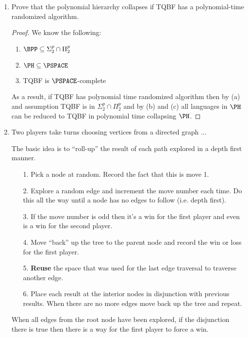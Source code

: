 \documentclass[usletter]{article}
\begin{document}
\begin{enumerate}
  \item Prove that the polynomial hierarchy collapses if TQBF has a polynomial-time randomized algorithm.

    \begin{proof}
      We know the following:

      \begin{enumerate}
        \item $\BPP \subseteq \Sigma_{2}^{p} \cap \Pi_{2}^{p}$
        \item $\PH \subseteq \PSPACE$
        \item TQBF is $\PSPACE$-complete
      \end{enumerate}

      As a result, if TQBF has polynomial time randomized algorithm then by (a) and assumption TQBF is in $\Sigma_{2}^{p} \cap \Pi_{2}^{p}$ and by (b) and (c) all languages in $\PH$ can be reduced to TQBF in polynomial time collapsing $\PH$.
    \end{proof}

  \item Two players take turns choosing vertices from a directed graph ...

    The basic idea is to ``roll-up'' the result of each path explored in a depth first manner.

   \begin{itemize}
     \item[1.] Pick a node at random. Record the fact that this is move 1.
     \item[2.] Explore a random edge and increment the move number each time. Do this all the way until a node has no edges to follow (i.e. depth first).
     \item[3.] If the move number is odd then it's a win for the first player and even is a win for the second player.
     \item[4.] Move ``back'' up the tree to the parent node and record the win or loss for the first player.
     \item[5.] \textbf{Reuse} the space that was used for the last edge traversal to traverse another edge.
     \item[6.] Place each result at the interior nodes in disjunction with previous results. When there are no more edges move back up the tree and repeat.
   \end{itemize}

   When all edges from the root node have been explored, if the disjunction there is true then there is a way for the first player to force a win.


\end{enumerate}
\end{document}
